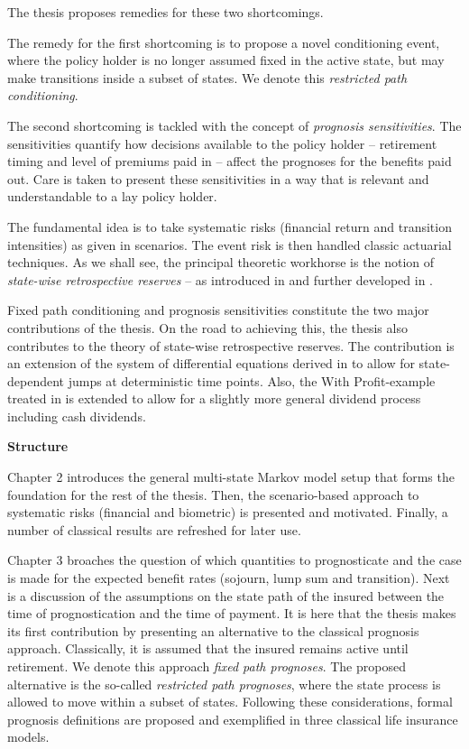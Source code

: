 \documentclass{article}
\newcommand{\1}[1]{\mathbbm{1}_{\left\lbrace #1 \right\rbrace}}
\theoremstyle{break}
\theoremstyle{remark}
\numberwithin{equation}{section}
\begin{document}
The thesis proposes remedies for these two shortcomings.

The remedy for the first shortcoming is to propose a novel conditioning event, where the policy holder is no longer assumed fixed in the active state, but may make transitions inside a subset of states. We denote this \textit{restricted path conditioning}.

The second shortcoming is tackled with the concept of \textit{prognosis sensitivities}. The sensitivities quantify how decisions available to the policy holder -- retirement timing and level of premiums paid in -- affect the prognoses for the benefits paid out. Care is taken to present these sensitivities in a way that is relevant and understandable to a lay policy holder.

The fundamental idea is to take systematic risks (financial return and transition intensities) as given in scenarios. The event risk is then handled classic actuarial techniques. As we shall see, the principal theoretic workhorse is the notion of \textit{state-wise retrospective reserves} -- as introduced in \cite{Norberg1991} and further developed in \cite{Lollike}.

Fixed path conditioning and prognosis sensitivities constitute the two major contributions of the thesis. On the road to achieving this, the thesis also contributes to the theory of state-wise retrospective reserves. The contribution is an extension of the system of differential equations derived in \cite{Lollike} to allow for state-dependent jumps at deterministic time points. Also, the With Profit-example treated in \cite{Lollike} is extended to allow for a slightly more general dividend process including cash dividends.

\textbf{Structure}

Chapter 2 introduces the general multi-state Markov model setup that forms the foundation for the rest of the thesis. Then, the scenario-based approach to systematic risks (financial and biometric) is presented and motivated. Finally, a number of classical results are refreshed for later use.

Chapter 3 broaches the question of which quantities to prognosticate and the case is made for the expected benefit rates (sojourn, lump sum and transition). Next is a discussion of the assumptions on the state path of the insured between the time of prognostication and the time of payment. It is here that the thesis makes its first contribution by presenting an alternative to the classical prognosis approach. Classically, it is assumed that the insured remains active until retirement. We denote this approach \textit{fixed path prognoses}. The proposed alternative is the so-called \textit{restricted path prognoses}, where the state process is allowed to move within a subset of states. Following these considerations, formal prognosis definitions are proposed and exemplified in three classical life insurance models.
\end{document}
